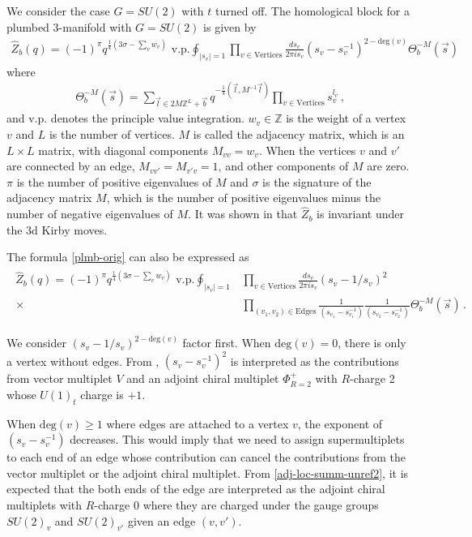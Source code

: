 \documentclass[11pt,hyper,a4paper]{article}
\begin{document}
We consider the case $G=SU(2)$ with $t$ turned off.
The homological block for a plumbed 3-manifold with $G=SU(2)$ \cite{Gukov-Pei-Putrov-Vafa, Gukov-Manolescu} is given by
\begin{align}
\widehat{Z}_b (q) = (-1)^{\pi} q^{\frac{1}{4}(3 \sigma - \sum_v w_v)} \text{ v.p.} \oint_{|s_v|=1} \prod_{v \in \text{Vertices}} \frac{ds_v}{2\pi i s_v} (s_v - s_v^{-1})^{2- \text{deg}(v)} \Theta_b^{-M}(\vec{s})	\label{plmb-orig}
\end{align}
where 
\begin{align}
\Theta_b^{-M}(\vec{s}) = \sum_{\vec{l} \in 2 M \mathbb{Z}^L + \vec{b}} q^{-\frac{1}{4} (\vec{l}, M^{-1} \vec{l} )} \prod_{v \in \text{Vertices}} s_v^{l_v}	\,	,
\end{align}
and $\text{v.p.}$ denotes the principle value integration.
$w_v \in \mathbb{Z}$ is the weight of a vertex $v$ and $L$ is the number of vertices.
$M$ is called the adjacency matrix, which is an $L \times L$ matrix, with diagonal components $M_{vv}=w_v$.
When the vertices $v$ and $v'$ are connected by an edge, $M_{vv'}=M_{v'v}=1$, and other components of $M$ are zero.
$\pi$ is the number of positive eigenvalues of $M$ and $\sigma$ is the signature of the adjacency matrix $M$, which is the number of positive eigenvalues minus the number of negative eigenvalues of $M$.
It was shown in \cite{Gukov-Manolescu} that $\widehat{Z}_b$ is invariant under the 3d Kirby moves.	


The formula \eqref{plmb-orig} can also be expressed as
\begin{align}
\begin{split}
\widehat{Z}_b (q) = (-1)^{\pi} q^{\frac{1}{4}(3 \sigma - \sum_v w_v)} \text{ v.p.} \oint_{|s_v|=1} &\prod_{v \in \text{Vertices}} \frac{ds_v}{2\pi i s_v} (s_v - 1/s_v)^{2}	\\
\times & \prod_{(v_1,v_2) \in \text{Edges}} \frac{1}{(s_{v_1}-s_{v_1}^{-1})} \frac{1}{(s_{v_2}-s_{v_2}^{-1})} \Theta_b^{-M}(\vec{s})	\,	.	
\end{split}
\end{align}


We consider $(s_v - 1/s_v)^{2- \text{deg}(v)}$ factor first.
When $\text{deg}(v)=0$, there is only a vertex without edges.
From \cite{Gukov-Putrov-Vafa, Gukov-Pei-Putrov-Vafa}, $(s_v - s_v^{-1})^{2}$ is interpreted as the contributions from vector multiplet $V$ and an adjoint chiral multiplet $\Phi_{R=2}^+$ with $R$-charge 2 whose $U(1)_t$ charge is $+1$.


When $\text{deg}(v) \geq 1$ where edges are attached to a vertex $v$, the exponent of $(s_v-s_v^{-1})$ decreases.
This would imply that we need to assign supermultiplets to each end of an edge whose contribution can cancel the contributions from the vector multiplet or the adjoint chiral multiplet.
From \eqref{adj-loc-summ-unref2}, it is expected that the both ends of the edge are interpreted as the adjoint chiral multiplets with $R$-charge 0 where they are charged under the gauge groups $SU(2)_v$ and $SU(2)_{v'}$ given an edge $(v,v')$.
\end{document}
